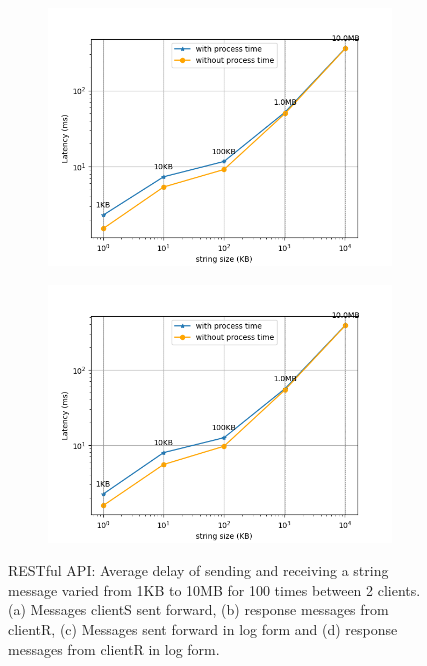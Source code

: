 \begin{figure}[htb]
    \begin{subfigure}[b]{0.49\textwidth}
        \centering
        \includegraphics[width=\textwidth]{figures/tests/proportional_tests/Rest_log_Average_string_messages_sending_time_of_100_tests.png}\hfill 
        \caption{} \label{fig: proportional-rest-stringsize-c}
    \end{subfigure}
    \begin{subfigure}[b]{0.49\textwidth}
        \centering
        \includegraphics[width=\textwidth]{figures/tests/proportional_tests/Rest_log_Average_string_messages_receiving_time_of_100_tests.png}\hfill 
        \caption{} \label{fig: proportional-rest-stringsize-d}
    \end{subfigure}
    \caption{RESTful API: Average delay of sending and receiving a string message varied from 1KB 
    to 10MB for 100 times between 2 clients. (a) Messages clientS sent forward, 
    (b) response messages from clientR, (c) Messages sent forward in log form 
    and (d) response messages from clientR in log form. 
    \label{fig: proportional-rest-stringsize}}
\end{figure}





